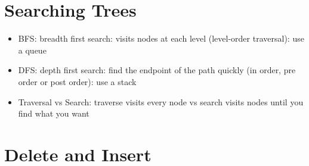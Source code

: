\documentclass[
]{book}
\begin{document}
\hypertarget{searching-trees}{%
\section{Searching Trees}\label{searching-trees}}

\begin{itemize}
\item
  BFS: breadth first search: visits nodes at each level (level-order traversal): use a queue
\item
  DFS: depth first search: find the endpoint of the path quickly (in order, pre order or post order): use a stack
\item
  Traversal vs Search: traverse visits every node vs search visits nodes until you find what you want
\end{itemize}

\hypertarget{delete-and-insert}{%
\section{Delete and Insert}\label{delete-and-insert}}
\end{document}
